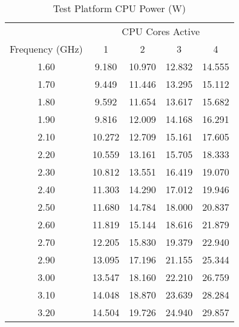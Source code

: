 


\begin{table}
\centering
\small
\begin{tabular}{@{}ccccc@{}} \toprule
&\multicolumn{4}{c}{CPU Cores Active} \\ \cmidrule(r){2-5}
Frequency (GHz) & 1 & 2 & 3 & 4 \\ \midrule 
1.60 & 9.180 & 10.970 & 12.832 & 14.555 \\ 
1.70 & 9.449 & 11.446 & 13.295 & 15.112 \\ 
1.80 & 9.592 & 11.654 & 13.617 & 15.682 \\ 
1.90 & 9.816 & 12.009 & 14.168 & 16.291 \\ 
2.10 & 10.272 & 12.709 & 15.161 & 17.605 \\ 
2.20 & 10.559 & 13.161 & 15.705 & 18.333 \\ 
2.30 & 10.812 & 13.551 & 16.419 & 19.070 \\ 
2.40 & 11.303 & 14.290 & 17.012 & 19.946 \\ 
2.50 & 11.680 & 14.784 & 18.000 & 20.837 \\ 
2.60 & 11.819 & 15.144 & 18.616 & 21.879 \\ 
2.70 & 12.205 & 15.830 & 19.379 & 22.940 \\ 
2.90 & 13.095 & 17.196 & 21.155 & 25.344 \\ 
3.00 & 13.547 & 18.160 & 22.210 & 26.759 \\ 
3.10 & 14.048 & 18.870 & 23.639 & 28.284 \\ 
3.20 & 14.504 & 19.726 & 24.940 & 29.857 \\ 
\bottomrule
\end{tabular}
   \vspace{0.5\baselineskip}
\caption{Test Platform CPU Power (W)}
\end{table} 




